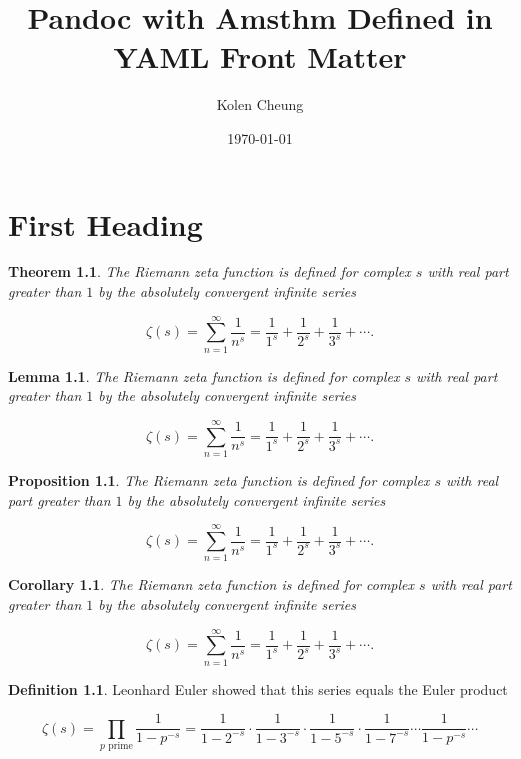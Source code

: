 \documentclass[english,oneside, article]{memoir}
\title{Pandoc with Amsthm Defined in YAML Front Matter}
\author{Kolen Cheung}
\date{\today}
\theoremstyle{plain}
\newtheorem{Theorem}{Theorem}[chapter]
\newtheorem*{Lemma}{Lemma}
\newtheorem*{Proposition}{Proposition}
\newtheorem*{Corollary}{Corollary}
\theoremstyle{definition}
\newtheorem{Definition}{Definition}[chapter]
\theoremstyle{remark}
\begin{document}
\maketitle

{
\hypersetup{linkcolor=black}
\setcounter{tocdepth}{5}
\tableofcontents
}
\chapter{First Heading}\label{first-heading}

\begin{Theorem}

The Riemann zeta function is defined for complex \(s\) with real part
greater than \(1\) by the absolutely convergent infinite series

\[\zeta(s) = \sum_{n=1}^\infty \frac{1}{n^s} = \frac{1}{1^s} + \frac{1}{2^s} + \frac{1}{3^s} + \cdots.\]

\end{Theorem}

\begin{Lemma}

The Riemann zeta function is defined for complex \(s\) with real part
greater than \(1\) by the absolutely convergent infinite series

\[\zeta(s) = \sum_{n=1}^\infty \frac{1}{n^s} = \frac{1}{1^s} + \frac{1}{2^s} + \frac{1}{3^s} + \cdots.\]

\end{Lemma}

\begin{Proposition}

The Riemann zeta function is defined for complex \(s\) with real part
greater than \(1\) by the absolutely convergent infinite series

\[\zeta(s) = \sum_{n=1}^\infty \frac{1}{n^s} = \frac{1}{1^s} + \frac{1}{2^s} + \frac{1}{3^s} + \cdots.\]

\end{Proposition}

\begin{Corollary}

The Riemann zeta function is defined for complex \(s\) with real part
greater than \(1\) by the absolutely convergent infinite series

\[\zeta(s) = \sum_{n=1}^\infty \frac{1}{n^s} = \frac{1}{1^s} + \frac{1}{2^s} + \frac{1}{3^s} + \cdots.\]

\end{Corollary}

\begin{Definition}

Leonhard Euler showed that this series equals the Euler product

\[\zeta(s) = \prod_{p \text{ prime}} \frac{1}{1-p^{-s}}= \frac{1}{1-2^{-s}}\cdot\frac{1}{1-3^{-s}}\cdot\frac{1}{1-5^{-s}}\cdot\frac{1}{1-7^{-s}} \cdots \frac{1}{1-p^{-s}} \cdots\]

\end{Definition}
\end{document}
